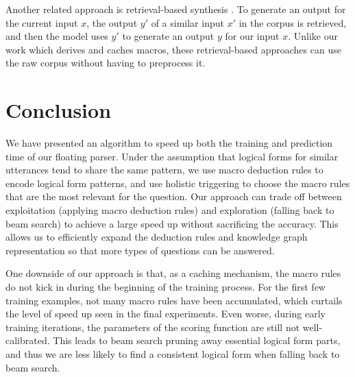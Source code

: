 Another related approach is retrieval-based synthesis
\cite{gu2017search,hayati2018retrieval,guu2018edit}.
To generate an output for the current input $x$,
the output $y'$ of a similar input $x'$ in the corpus
is retrieved, and then the model uses $y'$
to generate an output $y$ for our input $x$.
Unlike our work which derives and caches macros,
these retrieval-based approaches can use the raw corpus
without having to preprocess it.

\section{Conclusion}
We have presented an algorithm to speed up both the
training and prediction time of our floating parser.
Under the assumption that logical forms
for similar utterances tend to share
the same pattern,
we use macro deduction rules to encode logical form patterns,
and use holistic triggering to choose the macro rules
that are the most relevant for the question.
Our approach can trade off between 
exploitation (applying macro deduction rules)
and exploration (falling back to beam search)
to achieve a large speed up without sacrificing the accuracy.
This allows us to efficiently expand the deduction rules
and knowledge graph representation so that more types of questions
can be answered.

One downside of our approach is that,
as a caching mechanism,
the macro rules do not kick in during the beginning of
the training process.
For the first few training examples,
not many macro rules have been accumulated,
which curtails the level of speed up seen in the final experiments.
Even worse, during early training iterations,
the parameters of the scoring function
are still not well-calibrated.
This leads to beam search pruning away
essential logical form parts,
and thus we are less likely to find a consistent logical form
when falling back to beam search.


